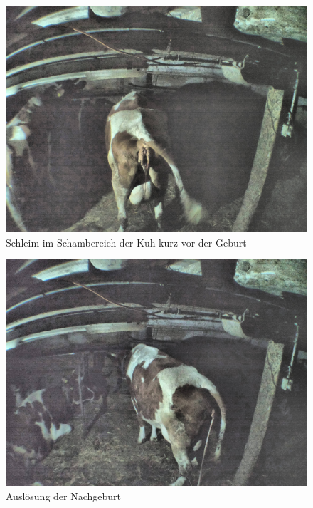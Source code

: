 \begin{figure}[h]
	\center
	\includegraphics[scale=0.45]{Grafiken/schleimvagina.jpg}
	\caption{Schleim im Schambereich der Kuh kurz vor der Geburt} 
	\label{fig: Schleim im Schambereich der Kuh kurz vor der Geburt}
\end{figure}


\begin{figure}[h]
	\center
	\includegraphics[scale=0.45]{Grafiken/schleim.jpg}
	\caption{Auslösung der Nachgeburt} 
	\label{fig: Auslösung der Nachgeburt}
\end{figure}